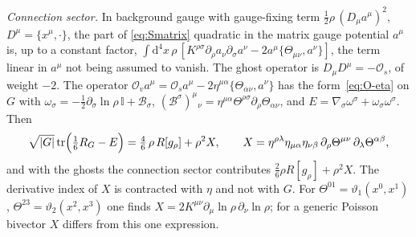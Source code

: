 \emph{Connection sector.} In background gauge with gauge-fixing term
\(\tfrac12\rho\,(D_\mu a^\mu)^2\), \(D^\mu=\{x^\mu,\cdot\}\), the part of
\eqref{eq:Smatrix} quadratic in the matrix gauge potential \(a^\mu\)
is, up to a constant factor,
\(\int\mathrm{d}^4x\,\rho\,[K^{\rho\sigma}\partial_\rho a_\nu\partial_\sigma a^\nu
-2a^\mu\{\Theta_{\mu\nu},a^\nu\}]\), the term linear in \(a^\mu\) not
being assumed to vanish. The ghost operator is
\(D_\mu D^\mu=-\mathcal O_s\), of weight \(-2\). The operator
\(\mathcal O_va^\mu=\mathcal O_sa^\mu
-2\eta^{\mu\alpha}\{\Theta_{\alpha\nu},a^\nu\}\) has the
form~\eqref{eq:O-eta} on \(G\) with
\(\omega_\sigma=-\tfrac12\partial_\sigma\ln\rho\,\mathbb I+\mathcal B_\sigma\),
\((\mathcal B^\sigma)^\mu{}_\nu=\eta^{\mu\alpha}\Theta^{\rho\sigma}
\partial_\rho\Theta_{\alpha\nu}\), and
\(E=\nabla_\sigma\omega^\sigma+\omega_\sigma\omega^\sigma\). Then
\[
  \sqrt{|G|}\operatorname{tr}\Bigl(\tfrac16R_G-E\Bigr)
  =\tfrac46\,\rho\,R[g_\rho]+\rho^2X,\qquad
  X=\eta^{\rho\lambda}\eta_{\mu\alpha}\eta_{\nu\beta}\,
    \partial_\rho\Theta^{\mu\nu}\,\partial_\lambda\Theta^{\alpha\beta},
\]
and with the ghosts the connection sector contributes
\(\tfrac26\rho R[g_\rho]+\rho^2X\). The derivative index of \(X\) is
contracted with \(\eta\) and not with \(G\). For
\(\Theta^{01}=\vartheta_1(x^0,x^1)\), \(\Theta^{23}=\vartheta_2(x^2,x^3)\)
one finds
\(X=2K^{\mu\nu}\partial_\mu\ln\rho\,\partial_\nu\ln\rho\); for a
generic Poisson bivector \(X\) differs from this one expression.

